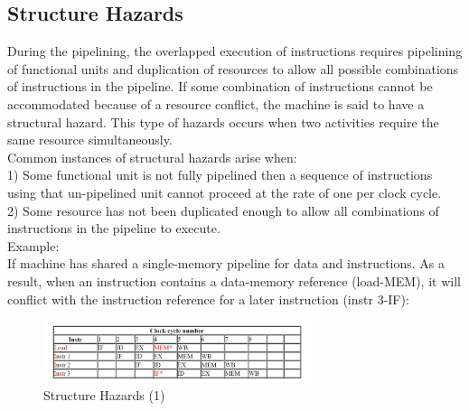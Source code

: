 \documentclass[12pt,a4paper]{report}
\begin{document}
\subsection{Structure Hazards}
During the pipelining, the overlapped execution of instructions requires pipelining of functional units and duplication of resources to allow all possible combinations of instructions in the pipeline. If some combination of instructions cannot be accommodated because of a resource conflict, the machine is said to have a structural hazard. This type of hazards occurs when two activities require the same resource simultaneously. \\
Common instances of structural hazards arise when: \\
1) Some functional unit is not fully pipelined then a sequence of instructions using that un-pipelined unit cannot proceed at the rate of one per clock cycle.\\ 2) Some resource has not been duplicated enough to allow all combinations of instructions in the pipeline to execute. \\
Example: \\
If machine has shared a single-memory pipeline for data and instructions. As a result, when an instruction contains a data-memory reference (load-MEM), it will conflict with the instruction reference for a later instruction (instr 3-IF): \\
\begin{figure}[h]
  \centering
  \includegraphics[width=0.7\textwidth]{SH}
  \caption{Structure Hazards (1)}
  \label{fig:sh}
\end{figure}
\end{document}
